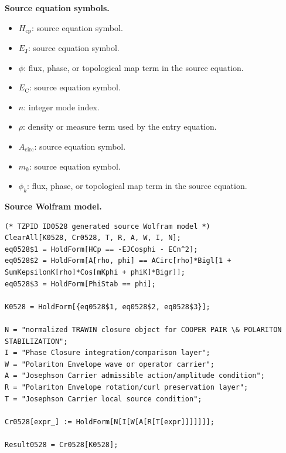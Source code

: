 \begin{minipage}[t]{0.49\linewidth}
\begingroup
\small
\raggedright
\textbf{Source equation symbols.}\par
\begin{itemize}[leftmargin=1.35em,itemsep=1pt,topsep=1pt,parsep=0pt]
    \item $H_{\mathrm{cp}}$: source equation symbol.
    \item $E_{\mathrm{J}}$: source equation symbol.
    \item $\phi$: flux, phase, or topological map term in the source equation.
    \item $E_{\mathrm{C}}$: source equation symbol.
    \item $n$: integer mode index.
    \item $\rho$: density or measure term used by the entry equation.
    \item $A_{\mathrm{circ}}$: source equation symbol.
    \item $m_{k}$: source equation symbol.
    \item $\phi_{k}$: flux, phase, or topological map term in the source equation.
\end{itemize}
\endgroup
\end{minipage}\hfill
\begin{minipage}[t]{0.47\linewidth}
\begingroup
\scriptsize
\raggedright
\textbf{Source Wolfram model.}\par
\begin{Verbatim}[fontsize=\tiny,breaklines=true,breakanywhere=true]
(* TZPID ID0528 generated source Wolfram model *)
ClearAll[K0528, Cr0528, T, R, A, W, I, N];
eq0528$1 = HoldForm[HCp == -EJCosphi - ECn^2];
eq0528$2 = HoldForm[A[rho, phi] == ACirc[rho]*Bigl[1 + SumKepsilonK[rho]*Cos[mKphi + phiK]*Bigr]];
eq0528$3 = HoldForm[PhiStab == phi];

K0528 = HoldForm[{eq0528$1, eq0528$2, eq0528$3}];

N = "normalized TRAWIN closure object for COOPER PAIR \& POLARITON STABILIZATION";
I = "Phase Closure integration/comparison layer";
W = "Polariton Envelope wave or operator carrier";
A = "Josephson Carrier admissible action/amplitude condition";
R = "Polariton Envelope rotation/curl preservation layer";
T = "Josephson Carrier local source condition";

Cr0528[expr_] := HoldForm[N[I[W[A[R[T[expr]]]]]]];

Result0528 = Cr0528[K0528];
\end{Verbatim}
\endgroup
\end{minipage}

